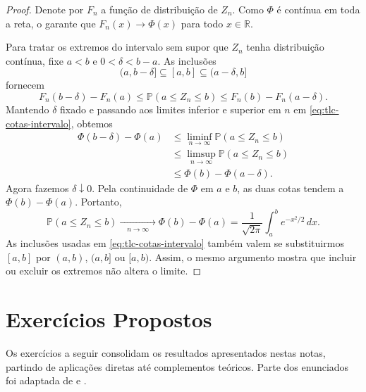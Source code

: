 \documentclass[12pt,portuguese]{article}
\theoremstyle{definition}
\theoremstyle{plainexercise}
\theoremstyle{starredexercise}
\theoremstyle{definition}
\begin{document}
\begin{proof}
Denote por $F_n$ a função de distribuição de $Z_n$. Como $\Phi$ é contínua em toda
a reta, o  garante que $F_n(x)\to\Phi(x)$ para todo
$x\in\mathbb{R}$.

Para tratar os extremos do intervalo sem supor que $Z_n$ tenha
distribuição contínua, fixe $a<b$ e $0<\delta<b-a$.
As inclusões
\[
(a,b-\delta]\subseteq[a,b]\subseteq(a-\delta,b]
\]
fornecem
\begin{equation}\label{eq:tlc-cotas-intervalo}
F_n(b-\delta)-F_n(a)
\leqslant\mathbb{P}(a\leqslant Z_n\leqslant b)
\leqslant F_n(b)-F_n(a-\delta).
\end{equation}
Mantendo $\delta$ fixado e passando aos limites inferior e superior
em $n$ em \eqref{eq:tlc-cotas-intervalo}, obtemos
\begin{align*}
\Phi(b-\delta)-\Phi(a)
&\leqslant\liminf_{n\to\infty}
\mathbb{P}(a\leqslant Z_n\leqslant b)
\\[0.3cm]
&\leqslant\limsup_{n\to\infty}
\mathbb{P}(a\leqslant Z_n\leqslant b)
\\[0.3cm]
&\leqslant\Phi(b)-\Phi(a-\delta).
\end{align*}
Agora fazemos $\delta\downarrow0$. Pela continuidade de $\Phi$
em $a$ e $b$, as duas cotas tendem a $\Phi(b)-\Phi(a)$.
Portanto,
\[
\mathbb{P}(a\leqslant Z_n\leqslant b)
\xrightarrow[\quad n\to\infty \quad]{}
\Phi(b)-\Phi(a)
=\frac{1}{\sqrt{2\pi}}\int_a^b e^{-x^2/2}\,dx.
\]
As inclusões usadas em \eqref{eq:tlc-cotas-intervalo} também valem
se substituirmos $[a,b]$ por $(a,b)$, $(a,b]$ ou $[a,b)$.
Assim, o mesmo argumento mostra que incluir ou excluir os extremos
não altera o limite.
\end{proof}

\section{Exercícios Propostos}\label{sec:exercicios}

Os exercícios a seguir consolidam os resultados apresentados nestas notas,
partindo de aplicações diretas até complementos teóricos. Parte dos enunciados
foi adaptada de \cite{GrimmettWelsh2014} e \cite{Ross2010}.
\end{document}
